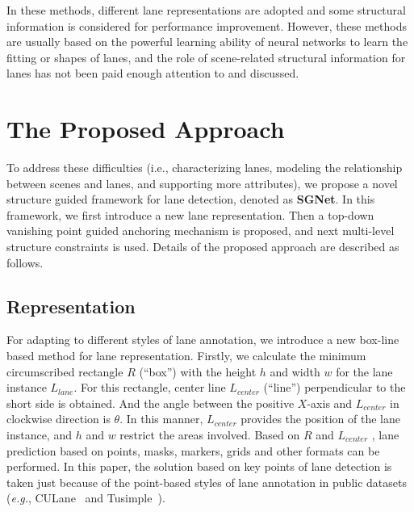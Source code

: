 \documentclass{article}
\def\eg{\emph{e.g.}}
\begin{document}
In these methods, different lane representations are adopted and some structural information is considered for performance improvement. However, these methods are usually based on the powerful learning ability of neural networks to learn the fitting or shapes of lanes, and the role of scene-related structural information for lanes has not been paid enough attention to and discussed.

\section{The Proposed Approach}
To address these difficulties (i.e., characterizing lanes, modeling the relationship between scenes and lanes, and supporting more attributes), we propose a novel structure guided framework for lane detection, denoted as \textbf{SGNet}. In this framework, we first introduce a new lane representation. Then a top-down vanishing point guided anchoring mechanism is proposed, and next multi-level structure constraints is used. Details of the proposed approach are described as follows.

\subsection{Representation}
For adapting to different styles of lane annotation, we introduce a new box-line based method for lane representation. Firstly, we calculate the minimum circumscribed rectangle $R$ (``box'') with the height $h$ and width $w$ for the lane instance $L_{lane}$. For this rectangle, center line $L_{center}$ (``line'') perpendicular to the short side is obtained. And the angle between the positive $X$-axis and $L_{center}$ in clockwise direction is $\theta$. In this manner, $L_{center}$ provides the position of the lane instance, and $h$ and $w$ restrict the areas involved. Based on $R$ and $L_{center}$ , lane prediction based on points, masks, markers, grids and other formats can be performed. In this paper, the solution based on key points of lane detection is taken just because of the point-based styles of lane annotation in public datasets (\eg, CULane~\cite{tusimple} and Tusimple~\cite{pan2018spatial}).
\end{document}
